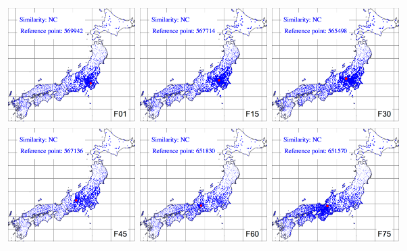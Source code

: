 \documentclass[output=paper]{LSP/langsci}
\begin{document}
\begin{figure}[b]
\includegraphics[width=0.3\textwidth]{illustrations/kuma_fig21-F01}
\includegraphics[width=0.3\textwidth]{illustrations/kuma_fig21-F15}
\includegraphics[width=0.3\textwidth]{illustrations/kuma_fig21-F30}
\\
\includegraphics[width=0.3\textwidth]{illustrations/kuma_fig21-F45}
\includegraphics[width=0.3\textwidth]{illustrations/kuma_fig21-F60}
\includegraphics[width=0.3\textwidth]{illustrations/kuma_fig21-F75}

\end{figure}
\end{document}
